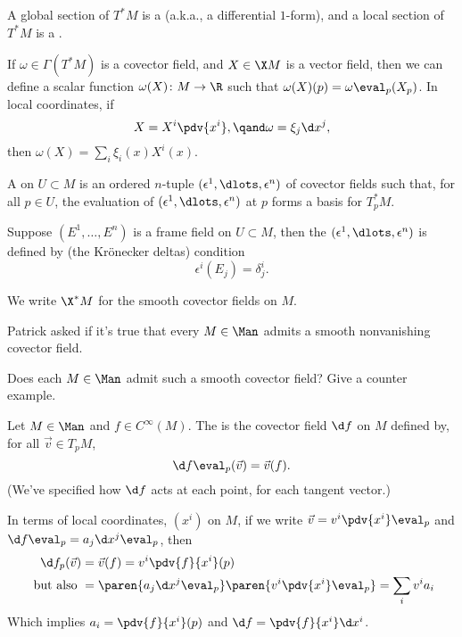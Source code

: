 \begin{defn}
    A global section of $T^*M$ is a  (a.k.a., a differential $1$-form), and a local section of $T^*M$ is a .
\end{defn}

If $\omega \in \Gamma(T^*M)$ is a covector field, and $X \in \X M$ is a vector field, then we can define a scalar function $\omega(X) \colon M \to \R$ such that $\omega(X)(p) = \omega\eval_p(X_p)$. In local coordinates, if 
\[
    X = X^i \pdv{x^i}, \qand \omega = \xi_j \d x^j,
\]
then $\omega(X) = \sum_i \xi_i(x) X^i(x)$.

\begin{defn}
    A  on $U \subset M$ is an ordered $n$-tuple $(\epsilon^1, \dlots, \epsilon^n)$ of covector fields such that, for all $p \in U$, the evaluation of $(\epsilon^1, \dlots, \epsilon^n)$  at $p$ forms a basis for $T^*_p M$.

    Suppose $(E^1, \ldots, E^n)$ is a frame field on $U \subset M$, then the  $(\epsilon^1, \dlots, \epsilon^n)$ is defined by (the Krönecker deltas) condition
    \[
        \epsilon^i(E_j) = \delta^i_j.
    \]
    
    We write $\X^* M$ for the smooth covector fields on $M$.
\end{defn}

Patrick asked if it's true that every $M \in \Man$ admits a smooth nonvanishing covector field. 

\begin{todo}[]
   Does each $M \in \Man$ admit such a smooth covector field? Give a counter example.
\end{todo}

\begin{defn}
   Let $M \in \Man$ and $f \in C^\infty(M)$. The  is the covector field $\d f$ on $M$ defined by, for all $\vec v \in T_p M$,
   \[
      \d f\eval_p (\vec v) = \vec v (f).
   \]
   (We've specified how $ \d f$ acts at each point, for each tangent vector.)
\end{defn}

In terms of local coordinates, $(x^i)$ on $M$, if we write $\vec v = v^i \pdv{x^i} \eval_p$ and $\d f \eval_p = a_j \d x^j \eval_p$, then 
\begin{align}
   \d f_p (\vec v) & = \vec v (f) = v^i \pdv{f}{x^i}(p)\\
   \text{ but also } & = \paren{a_j \d x^j \eval_p} \paren{v^i \pdv{x^i} \eval_p} = \sum_i v^i a_i
\end{align}
Which implies $a_i = \pdv{f}{x^i}(p)$ and $\d f = \pdv{f}{x^i} \d x^i$.

